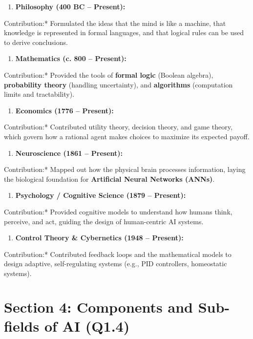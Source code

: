 \begin{enumerate}
  \item \textbf{Philosophy (400 BC -- Present):}
\end{enumerate}
    \textit{   }Contribution:* Formulated the ideas that the mind is like a machine, that knowledge is represented in formal languages, and that logical rules can be used to derive conclusions.
\begin{enumerate}
  \item \textbf{Mathematics (c. 800 -- Present):}
\end{enumerate}
    \textit{   }Contribution:* Provided the tools of \textbf{formal logic} (Boolean algebra), \textbf{probability theory} (handling uncertainty), and \textbf{algorithms} (computation limits and tractability).
\begin{enumerate}
  \item \textbf{Economics (1776 -- Present):}
\end{enumerate}
    \textit{   }Contribution:* Contributed utility theory, decision theory, and game theory, which govern how a rational agent makes choices to maximize its expected payoff.
\begin{enumerate}
  \item \textbf{Neuroscience (1861 -- Present):}
\end{enumerate}
    \textit{   }Contribution:* Mapped out how the physical brain processes information, laying the biological foundation for \textbf{Artificial Neural Networks (ANNs)}.
\begin{enumerate}
  \item \textbf{Psychology / Cognitive Science (1879 -- Present):}
\end{enumerate}
    \textit{   }Contribution:* Provided cognitive models to understand how humans think, perceive, and act, guiding the design of human-centric AI systems.
\begin{enumerate}
  \item \textbf{Control Theory \& Cybernetics (1948 -- Present):}
\end{enumerate}
    \textit{   }Contribution:* Contributed feedback loops and the mathematical models to design adaptive, self-regulating systems (e.g., PID controllers, homeostatic systems).


\section{Section 4: Components and Sub-fields of AI (Q1.4)}

